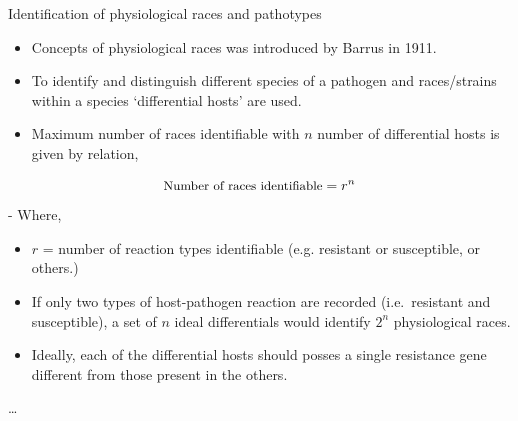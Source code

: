 \documentclass[10pt,dvipsnames,ignorenonframetext,aspectratio=169]{beamer}
\providecommand{\tightlist}{%
  \setlength{\itemsep}{0pt}\setlength{\parskip}{0pt}}
\begin{document}
\begin{frame}{Identification of physiological races and pathotypes}
\protect\hypertarget{identification-of-physiological-races-and-pathotypes}{}
\footnotesize

\begin{itemize}
\tightlist
\item
  Concepts of physiological races was introduced by Barrus in 1911.
\item
  To identify and distinguish different species of a pathogen and
  races/strains within a species `differential hosts' are used.

\item
  Maximum number of races identifiable with \(n\) number of differential
  hosts is given by relation,
\end{itemize}

\[
\small
\text{Number of races identifiable} = r^n
\] - Where,

\begin{itemize}
  \item $r$ = number of reaction types identifiable (e.g. resistant or susceptible, or others.)
  \end{itemize}

\begin{itemize}
\tightlist
\item
  If only two types of host-pathogen reaction are recorded
  (i.e.~resistant and susceptible), a set of \(n\) ideal differentials
  would identify \(2^n\) physiological races.
\item
  Ideally, each of the differential hosts should posses a single
  resistance gene different from those present in the others.
\end{itemize}
\end{frame}

\begin{frame}{}
\protect\hypertarget{section-1}{}
\ldots{}
\end{frame}
\end{document}

